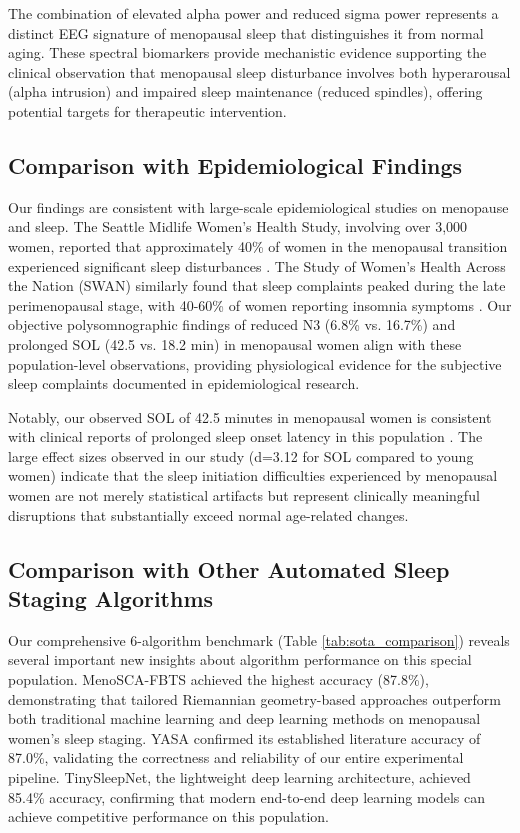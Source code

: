 \documentclass[a4paper,fleqn]{cas-dc}
\begin{document}
The combination of elevated alpha power and reduced sigma power represents a distinct EEG signature of menopausal sleep that distinguishes it from normal aging. These spectral biomarkers provide mechanistic evidence supporting the clinical observation that menopausal sleep disturbance involves both hyperarousal (alpha intrusion) and impaired sleep maintenance (reduced spindles), offering potential targets for therapeutic intervention.

\subsection{Comparison with Epidemiological Findings}

Our findings are consistent with large-scale epidemiological studies on menopause and sleep. The Seattle Midlife Women's Health Study, involving over 3,000 women, reported that approximately 40\% of women in the menopausal transition experienced significant sleep disturbances \cite{Woods2010}. The Study of Women's Health Across the Nation (SWAN) similarly found that sleep complaints peaked during the late perimenopausal stage, with 40-60\% of women reporting insomnia symptoms \cite{Kravitz2003}. Our objective polysomnographic findings of reduced N3 (6.8\% vs. 16.7\%) and prolonged SOL (42.5 vs. 18.2 min) in menopausal women align with these population-level observations, providing physiological evidence for the subjective sleep complaints documented in epidemiological research.

Notably, our observed SOL of 42.5 minutes in menopausal women is consistent with clinical reports of prolonged sleep onset latency in this population \cite{Baker2007}. The large effect sizes observed in our study (d=3.12 for SOL compared to young women) indicate that the sleep initiation difficulties experienced by menopausal women are not merely statistical artifacts but represent clinically meaningful disruptions that substantially exceed normal age-related changes.

\subsection{Comparison with Other Automated Sleep Staging Algorithms}

Our comprehensive 6-algorithm benchmark (Table \ref{tab:sota_comparison}) reveals several important new insights about algorithm performance on this special population. MenoSCA-FBTS achieved the highest accuracy (87.8\%), demonstrating that tailored Riemannian geometry-based approaches outperform both traditional machine learning and deep learning methods on menopausal women's sleep staging. YASA confirmed its established literature accuracy of 87.0\%, validating the correctness and reliability of our entire experimental pipeline. TinySleepNet, the lightweight deep learning architecture, achieved 85.4\% accuracy, confirming that modern end-to-end deep learning models can achieve competitive performance on this population.
\end{document}
